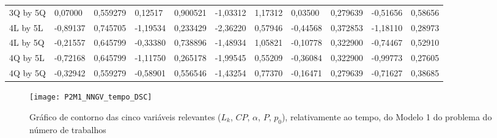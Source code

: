 \begin{table}[H]
{\begin{tabular}{lllllllllll}
\rowcolor[HTML]{FFFFFF} 
3Q by 5Q       & {\color[HTML]{181A1B} 0,07000}  & {\color[HTML]{181A1B} 0,559279} & {\color[HTML]{181A1B} 0,12517}  & {\color[HTML]{181A1B} 0,900521} & {\color[HTML]{181A1B} -1,03312} & {\color[HTML]{181A1B} 1,17312}  & {\color[HTML]{181A1B} 0,03500}  & {\color[HTML]{181A1B} 0,279639} & {\color[HTML]{181A1B} -0,51656} & {\color[HTML]{181A1B} 0,58656}  \\
\rowcolor[HTML]{FFFFFF} 
4L by 5L       & {\color[HTML]{181A1B} -0,89137} & {\color[HTML]{181A1B} 0,745705} & {\color[HTML]{181A1B} -1,19534} & {\color[HTML]{181A1B} 0,233429} & {\color[HTML]{181A1B} -2,36220} & {\color[HTML]{181A1B} 0,57946}  & {\color[HTML]{181A1B} -0,44568} & {\color[HTML]{181A1B} 0,372853} & {\color[HTML]{181A1B} -1,18110} & {\color[HTML]{181A1B} 0,28973}  \\
\rowcolor[HTML]{FFFFFF} 
4L by 5Q       & {\color[HTML]{181A1B} -0,21557} & {\color[HTML]{181A1B} 0,645799} & {\color[HTML]{181A1B} -0,33380} & {\color[HTML]{181A1B} 0,738896} & {\color[HTML]{181A1B} -1,48934} & {\color[HTML]{181A1B} 1,05821}  & {\color[HTML]{181A1B} -0,10778} & {\color[HTML]{181A1B} 0,322900} & {\color[HTML]{181A1B} -0,74467} & {\color[HTML]{181A1B} 0,52910}  \\
\rowcolor[HTML]{FFFFFF} 
4Q by 5L       & {\color[HTML]{181A1B} -0,72168} & {\color[HTML]{181A1B} 0,645799} & {\color[HTML]{181A1B} -1,11750} & {\color[HTML]{181A1B} 0,265178} & {\color[HTML]{181A1B} -1,99545} & {\color[HTML]{181A1B} 0,55209}  & {\color[HTML]{181A1B} -0,36084} & {\color[HTML]{181A1B} 0,322900} & {\color[HTML]{181A1B} -0,99773} & {\color[HTML]{181A1B} 0,27605}  \\
\rowcolor[HTML]{FFFFFF} 
4Q by 5Q       & {\color[HTML]{181A1B} -0,32942} & {\color[HTML]{181A1B} 0,559279} & {\color[HTML]{181A1B} -0,58901} & {\color[HTML]{181A1B} 0,556546} & {\color[HTML]{181A1B} -1,43254} & {\color[HTML]{181A1B} 0,77370}  & {\color[HTML]{181A1B} -0,16471} & {\color[HTML]{181A1B} 0,279639} & {\color[HTML]{181A1B} -0,71627} & {\color[HTML]{181A1B} 0,38685} 
\end{tabular}
}
\end{table}

\begin{figure}[H]
\caption{Gráfico de contorno das cinco variáveis relevantes ($L_{k}$, $CP$, $\alpha$, $P$, $p_{0}$), relativamente ao tempo, do Modelo 1 do problema do número de trabalhos}
\centering
\texttt{[image: P2M1\_NNGV\_tempo\_DSC]}
\end{figure}



